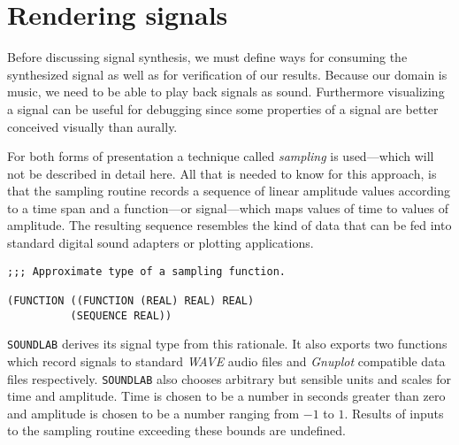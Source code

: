 \section{Rendering signals}

Before discussing signal synthesis, we must define ways for consuming the
synthesized signal as well as for verification of our results. Because
our domain is music, we need to be able to play back signals as sound.
Furthermore visualizing a signal can be useful for debugging since some
properties of a signal are better conceived visually than aurally.

For both forms of presentation a technique called \textit{sampling} is
used---which will not be described in detail here. All that is needed
to know for this approach, is that the sampling routine records a
sequence of linear amplitude values according to a time span and a
function---or signal---which maps values of time to values of
amplitude. The resulting sequence resembles the kind of data that can be
fed into standard digital sound adapters or plotting applications.

\begin{verbatim}
;;; Approximate type of a sampling function.

(FUNCTION ((FUNCTION (REAL) REAL) REAL)
          (SEQUENCE REAL))
\end{verbatim}

\texttt{SOUNDLAB} derives its signal type from this rationale. It also
exports two functions which record signals to standard \textit{WAVE}
audio files and \textit{Gnuplot} compatible data files
respectively. \texttt{SOUNDLAB} also chooses arbitrary but sensible units
and scales for time and amplitude. Time is chosen to be a number in
seconds greater than zero and amplitude is chosen to be a number ranging
from $-1$ to $1$. Results of inputs to the sampling routine exceeding
these bounds are undefined.
